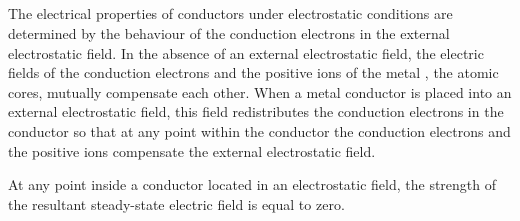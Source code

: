\subsection{}\label{16.4.2} The electrical properties of conductors under electrostatic conditions are determined by the behaviour of the conduction electrons in the external electrostatic field. In the absence of an external electrostatic field, the electric fields of the conduction electrons and the positive ions of the metal , the atomic cores, mutually compensate each other. When a metal conductor is placed into an external electrostatic field, this field redistributes the conduction electrons in the conductor so that at any point within the conductor the conduction electrons and the positive ions compensate the external electrostatic field.

At any point inside a conductor located in an electrostatic field, the strength of the resultant steady-state electric field is equal to zero.

